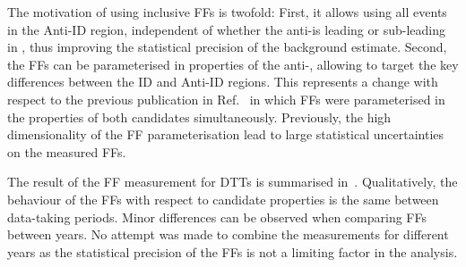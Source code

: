 {  %


  The motivation of using inclusive FFs is twofold: First, it allows using all
  events in the Anti-ID region, independent of whether the anti-\tauhadvis is
  leading or sub-leading in \pT, thus improving the statistical precision of the
  background estimate. Second, the FFs can be parameterised in properties of the
  anti-\tauhadvis, allowing to target the key differences between the ID and
  Anti-ID regions. This represents a change with respect to the previous
  publication in Ref.~\cite{HIGG-2016-16-witherratum} in which FFs were
  parameterised in the properties of both \tauhadvis candidates
  simultaneously. Previously, the high dimensionality of the FF parameterisation
  lead to large statistical uncertainties on the measured FFs.}


The result of the FF measurement for DTTs is summarised
in~. Qualitatively, the behaviour of the FFs with
respect to \tauhadvis candidate properties is the same between data-taking
periods. Minor differences can be observed when comparing FFs between years. No
attempt was made to combine the measurements for different years as the
statistical precision of the FFs is not a limiting factor in the analysis.

